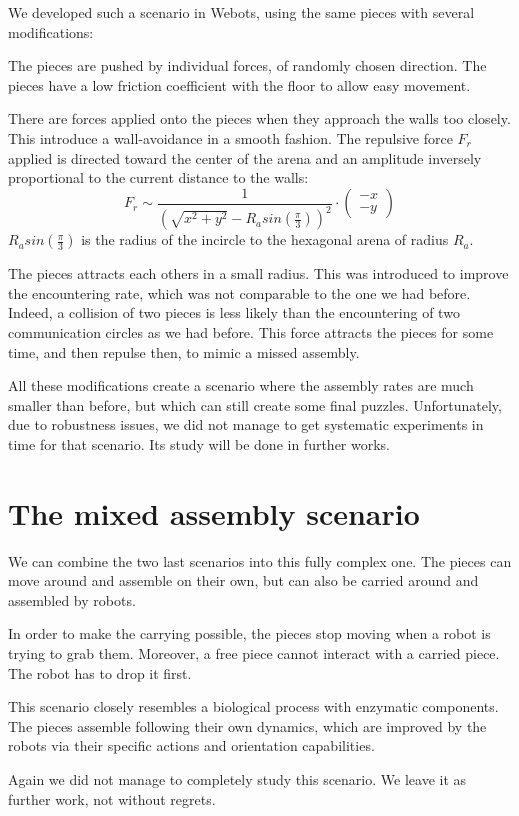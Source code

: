 We developed such a scenario in Webots, using the same pieces with several modifications:
\begin{my_itemize}
	\item The pieces are pushed by individual forces, of randomly chosen direction. The pieces have a low friction coefficient with the floor to allow easy movement.
	\item There are forces applied onto the pieces when they approach the walls too closely. This introduce a wall-avoidance in a smooth fashion. The repulsive force $F_r$ applied is directed toward the center of the arena and an amplitude inversely proportional to the current distance to the walls:
	\[
		F_r \sim \frac{1}{\left(\sqrt{x^2+y^2} - R_a sin(\frac{\pi}{3}) \right)^2} \cdot \left( 
		\begin{array}{c} -x \\
			-y \end{array} \right)
	\]
	$R_a sin(\frac{\pi}{3})$ is the radius of the incircle to the hexagonal arena of radius $R_a$. 
	\item The pieces attracts each others in a small radius. This was introduced to improve the encountering rate, which was not comparable to the one we had before. Indeed, a collision of two pieces is less likely than the encountering of two communication circles as we had before. This force attracts the pieces for some time, and then repulse then, to mimic a missed assembly.
\end{my_itemize}

All these modifications create a scenario where the assembly rates are much smaller than before, but which can still create some final puzzles. Unfortunately, due to robustness issues, we did not manage to get systematic experiments in time for that scenario. Its study will be done in further works.


\section{The mixed assembly scenario} %
\label{sec:the_mixed_assembly_scenario}

We can combine the two last scenarios into this fully complex one. The pieces can move around and assemble on their own, but can also be carried around and assembled by robots.

In order to make the carrying possible, the pieces stop moving when a robot is trying to grab them. Moreover, a free piece cannot interact with a carried piece. The robot has to drop it first.

This scenario closely resembles a biological process with enzymatic components. The pieces assemble following their own dynamics, which are improved by the robots via their specific actions and orientation capabilities.

Again we did not manage to completely study this scenario. We leave it as further work, not without regrets.